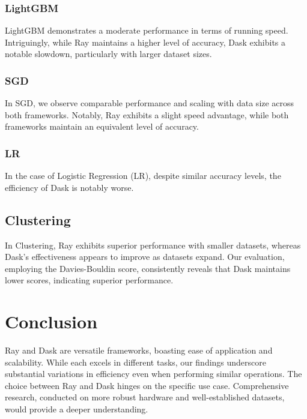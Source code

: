 \documentclass[conference]{IEEEtran}
\begin{document}
\subsubsection{LightGBM}
LightGBM demonstrates a moderate performance in terms of running speed. Intriguingly, while Ray maintains a higher level of accuracy, Dask exhibits a notable slowdown, particularly with larger dataset sizes.
\subsubsection{SGD}
In SGD, we observe comparable performance and scaling with data size across both frameworks. Notably, Ray exhibits a slight speed advantage, while both frameworks maintain an equivalent level of accuracy.
\subsubsection{LR}
In the case of Logistic Regression (LR), despite similar accuracy levels, the efficiency of Dask is notably worse.
\subsection{Clustering}
In Clustering, Ray exhibits superior performance with smaller datasets, whereas Dask's effectiveness appears to improve as datasets expand. Our evaluation, employing the Davies-Bouldin score, consistently reveals that Dask maintains lower scores, indicating superior performance.
\section{Conclusion}
Ray and Dask are versatile frameworks, boasting ease of application and scalability. While each excels in different tasks, our findings underscore substantial variations in efficiency even when performing similar operations. The choice between Ray and Dask hinges on the specific use case. Comprehensive research, conducted on more robust hardware and well-established datasets, would provide a deeper understanding.
\end{document}
